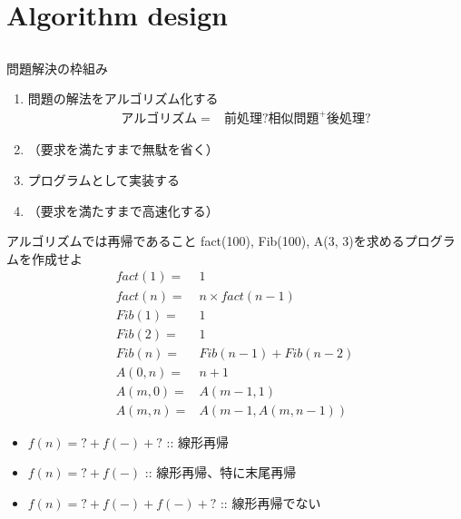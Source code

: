 \documentclass{beamer}
\subtitle{プログラミング的思考}
\begin{document}
\begin{frame}[fragile]{}
\titlepage
\end{frame}

\section{Algorithm design}		%
\subsection{}

\begin{frame}[fragile]{問題解決の枠組み}{}
\begin{enumerate}\itemsep8pt
\item 問題の解法をアルゴリズム化する
\begin{align*}
アルゴリズム = & 前処理? 相似問題^{+} 後処理?
\end{align*}
\item （要求を満たすまで無駄を省く）
\item プログラムとして実装する
\item （要求を満たすまで高速化する）
\end{enumerate}
\end{frame}

\begin{frame}[fragile]{アルゴリズムでは再帰であること}{}
fact(100), Fib(100), A(3, 3)を求めるプログラムを作成せよ
\begin{align*}
fact(1) =& 1 \\
fact(n) =& n \times fact(n - 1)\\
Fib(1) =& 1 \\
Fib(2) =& 1 \\
Fib(n) =& Fib(n - 1) + Fib(n -2) \\
A(0, n) =& n + 1 \\
A(m, 0) =& A(m - 1, 1) \\
A(m, n) =& A(m - 1, A(m, n - 1))
\end{align*}

\begin{itemize}%
\item $f(n) = ? + f(-) + ?$ :: 線形再帰
\item $f(n) = ? + f(-)$ :: 線形再帰、特に末尾再帰\href{https://ja.wikipedia.org/wiki/%E6%9C%AB%E5%B0%BE%E5%86%8D%E5%B8%B0}{\beamergotobutton{wikipedia}}
\item $f(n) = ? + f(-) + f(-) + ?$ :: 線形再帰でない
\end{itemize}
\end{frame}
\end{document}
